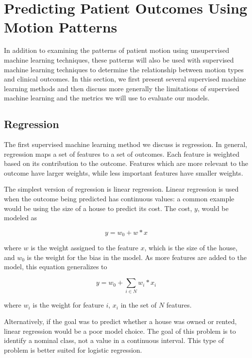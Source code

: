 \section{Predicting Patient Outcomes Using Motion Patterns}

In addition to examining the patterns of patient motion using unsupervised machine learning techniques, these patterns will also be used with supervised machine learning techniques to determine the relationship between motion types and clinical outcomes. In this section, we first present several supervised machine learning methods and then discuss more generally the limitations of supervised machine learning and the metrics we will use to evaluate our models.

\subsection{Regression}

The first supervised machine learning method we discuss is regression. In general, regression maps a set of features to a set of outcomes. Each feature is weighted based on its contribution to the outcome. Features which are more relevant to the outcome have larger weights, while less important features have smaller weights. 

The simplest version of regression is linear regression. Linear regression is used when the outcome being predicted has continuous values: a common example would be using the size of a house to predict its cost. The cost, $y$, would be modeled as

\begin{equation}
y = w_0 + w*x
\end{equation}

\noindent where $w$ is the weight assigned to the feature $x$, which is the size of the house, and $w_0$ is the weight for the bias in the model. As more features are added to the model, this equation generalizes to 

\begin{equation}
y = w_0 + \sum_{i \in N} w_i*x_i
\end{equation}

\noindent where $w_i$ is the weight for feature $i$, $x_i$ in the set of $N$ features. 

Alternatively, if the goal was to predict whether a house was owned or rented, linear regression would be a poor model choice. The goal of this problem is to identify a nominal class, not a value in a continuous interval. This type of problem is better suited for logistic regression.


